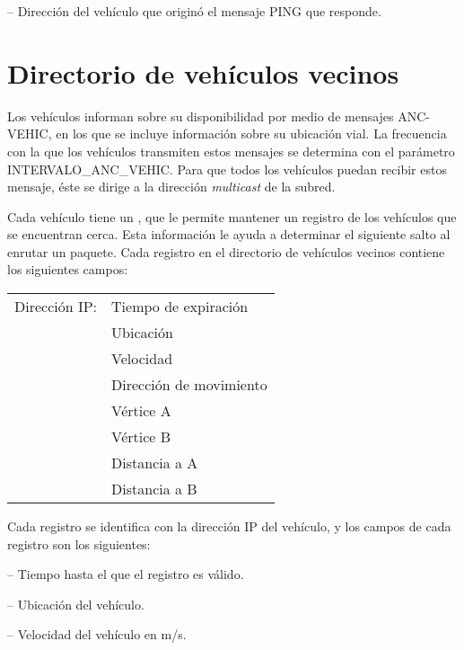  -- Dirección del vehículo que originó el
mensaje PING que responde.

\section{Directorio de vehículos vecinos}

\label{sec:directiorio_vehiculos_vecinos}

\begin{sloppypar}
Los vehículos informan sobre su disponibilidad por medio de mensajes
\mbox{ANC-VEHIC}, en los que se incluye información sobre su ubicación vial. La
frecuencia con la que los vehículos transmiten estos mensajes se determina con
el parámetro \mbox{INTERVALO\_ANC\_VEHIC}. Para que todos los vehículos puedan
recibir estos mensaje, éste se dirige a la dirección \textit{multicast} de la
subred.
\end{sloppypar}

Cada vehículo tiene un , que le
permite mantener un registro de los vehículos que se encuentran cerca. Esta
información le ayuda a determinar el siguiente salto al enrutar un paquete.
Cada registro en el directorio de vehículos vecinos contiene los siguientes
campos:

\begin{center}
\begin{tabular}{ r l }
Dirección IP: & Tiempo de expiración \\
& Ubicación \\
& Velocidad \\
& Dirección de movimiento \\
& Vértice A \\
& Vértice B \\
& Distancia a A \\
& Distancia a B
\end{tabular}
\end{center}

Cada registro se identifica con la dirección IP del vehículo, y los campos de
cada registro son los siguientes:

 -- Tiempo hasta el que el registro es válido.

 -- Ubicación del vehículo.

 -- Velocidad del vehículo en m/s.

